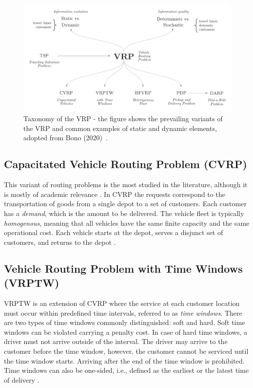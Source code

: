 	\begin{figure}[!ht]
		\centering
		\includegraphics[width=1\textwidth]{figures/vrp-variants.pdf}
		\caption[Taxonomy of the VRP.]{Taxonomy of the VRP - the figure shows the prevailing variants of the VRP and common examples of static and dynamic elements, adopted from Bono (2020)~\cite[p.~26~(modified)]{Bono2020}.}
		\label{fig:vrp-variants}
	\end{figure}

\subsection{Capacitated Vehicle Routing Problem (CVRP)}

This variant of routing problems is the most studied in the literature, although it is mostly of academic relevance \cite{toth2015vrp}. In CVRP the requests correspond to the transportation of goods from a single depot to a set of customers. Each customer has a \emph{demand}, which is the amount to be delivered. The vehicle fleet is typically \emph{homogenous}, meaning that all vehicles have the same finite capacity and the same operational cost. Each vehicle starts at the depot, serves a disjunct set of customers, and returns to the depot \cite{toth2015vrp, cvrp-2019}.

\subsection{Vehicle Routing Problem with Time Windows (VRPTW)}

VRPTW is an extension of CVRP where the service at each customer location must occur within predefined time intervals, referred to as \emph{time windows}. There are two types of time windows commonly distinguished: soft and hard. Soft time windows can be violated carrying a penalty cost. In case of hard time windows, a driver must not arrive outside of the interval. The driver may arrive to the customer before the time window, however, the customer cannot be serviced until the time window starts. Arriving after the end of the time window is prohibited. Time windows can also be one-sided, i.e., defined as the earliest or the latest time of delivery \cite{wrptw, toth2015vrp, 2007-cordeau}.

